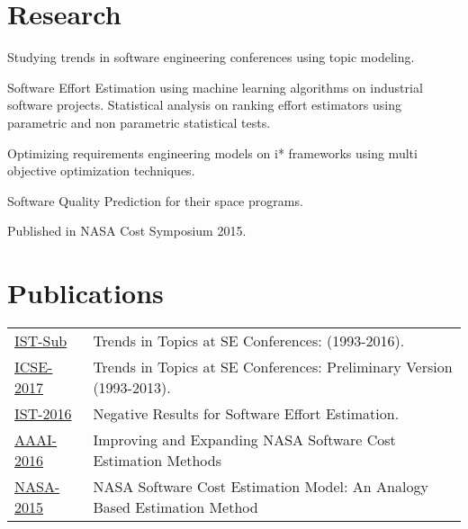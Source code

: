 \documentclass[]{bigfatnoob-resume}
\begin{document}
\begin{minipage}[t]{0.66\textwidth}

\section{Research}
\begin{tightemize}
\item Studying trends in software engineering conferences using topic modeling.
\item Software Effort Estimation using machine learning algorithms on industrial software projects. Statistical analysis on ranking effort estimators using parametric and non parametric statistical tests.
\item Optimizing requirements engineering models on i* frameworks using multi objective optimization techniques.
\end{tightemize}
\sectionsep

\descript{}
\begin{tightemize}
\item Software Quality Prediction for their space programs.
\item Published in NASA Cost Symposium 2015.
\end{tightemize}
\sectionsep


\section{Publications} 
\begin{tabular}{p{2cm}p{9.2cm}}
	\href{https://arxiv.org/abs/1608.08100}{IST-Sub} & Trends in Topics at SE Conferences: (1993-2016).\\
	\href{https://arxiv.org/abs/1608.08100}{ICSE-2017} & Trends in Topics at SE Conferences: Preliminary Version (1993-2013).\\
	\href{https://arxiv.org/abs/1609.05563}{IST-2016} & Negative Results for Software Effort Estimation.\\
	\href{http://ieeexplore.ieee.org/stamp/stamp.jsp?arnumber=7500655&tag=1}{AAAI-2016} & Improving and Expanding NASA Software Cost Estimation Methods \\
	\href{https://www.nasa.gov/sites/default/files/files/27_NASA_SC_SW_Cost_Model_final.pdf}{NASA-2015}  & NASA Software Cost Estimation Model: An Analogy Based Estimation Method\\
\end{tabular}
\sectionsep

\end{minipage} 
\end{document}
